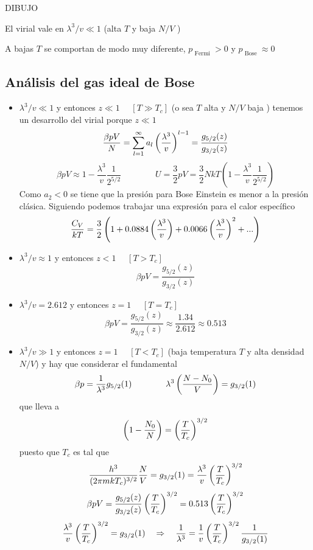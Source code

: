 \documentclass[10pt,oneside]{CBFT_book}
\begin{document}
DIBUJO 

El virial vale en $\lambda^3/v \ll 1$ (alta $T$ y baja $N/V$ )

A bajas $T$ se comportan de modo muy diferente, $p_{\text{ Fermi }} > 0 $ y
$p_{\text{ Bose }} \approx 0$

\subsection{Análisis del gas ideal de Bose}

\begin{itemize}
 \item $ \lambda^3 / v \ll 1 $ y entonces $ z \ll 1 $ $\quad  [T \gg T_c ] $ (o sea $T$ alta y $N/V$ baja )
 tenemos un desarrollo del virial porque $z \ll 1$
 \[
	\frac{\beta p V}{N} = \sum_{l=1}^\infty a_l \left( \frac{ \lambda^3 }{ v } \right)^{l-1} = \frac{ g_{5/2}(z) }{ g_{3/2}(z) }
 \]
 \[
	\beta p V \approx 1 - \frac{\lambda^3}{v} \frac{1}{2^{5/2}} \qquad \qquad 
	U = \frac{3}{2}pV = \frac{3}{2} NkT \left( 1 - \frac{\lambda^3}{v} \frac{1}{2^{5/2}} \right)
 \]
 Como $a_2 < 0$ se tiene que la presión para Bose Einstein es menor a la presión clásica. Siguiendo
 podemos trabajar una expresión para el calor específico
 \[
	\frac{C_V}{kT} = \frac{3}{2} \left( 1 + 0.0884 \left( \frac{ \lambda^3 }{ v } \right) + 
	0.0066 \left( \frac{ \lambda^3 }{ v } \right)^2 + ... \right)
 \]
 
 \item $ \lambda^3 / v \approx 1 $ y entonces $ z < 1 $ $\quad  [T > T_c ] $
 \[
	\beta p V = \frac{ g_{5/2}(z) }{ g_{3/2}(z) }
 \]
 \item  $ \lambda^3 / v = 2.612 $ y entonces $ z = 1 $ $\quad  [T = T_c ] $
 \[
	\beta p V = \frac{ g_{5/2}(z) }{ g_{3/2}(z) } \approx \frac{1.34}{2.612} \approx 0.513
 \]
 \item $ \lambda^3 / v \gg 1 $ y entonces $ z = 1 $ $\quad  [T < T_c ] $ (baja temperatura $T$ y alta
 densidad $N/V$) y hay que considerar el  fundamental
 \[
	\beta p = \frac{1}{\lambda^3} g_{5/2}(1) \qquad \qquad \lambda^3\left( \frac{ N-N_0 }{ V } \right) = g_{3/2}(1)
 \]
 que lleva a 
 \[
	\left( 1 - \frac{N_0}{N} \right) = \left( \frac{ T }{ T_c } \right)^{3/2}
 \]
 puesto que $T_c$ es tal que 
 \[
	\frac{h^3}{(2\pi m kT_c)^{3/2}} \frac{N}{V} = g_{3/2}(1) = \frac{\lambda^3}{v}\left( \frac{ T }{ T_c } \right)^{3/2}
 \]
 \[
	\beta p V = \frac{ g_{5/2}(z) }{ g_{3/2}(z) } \left( \frac{ T }{ T_c } \right)^{3/2} = 0.513 \left( \frac{ T }{ T_c } \right)^{3/2}
 \]
 \[
	\frac{\lambda^3}{v} \left( \frac{ T }{ T_c } \right)^{3/2} = g_{3/2}(1) \quad \Rightarrow \quad \frac{1}{\lambda^3} =
	\frac{1}{v}\left( \frac{ T }{ T_c } \right)^{3/2} \frac{1}{g_{3/2}(1)}
 \]
\end{itemize}
\end{document}
